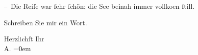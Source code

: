 \pstart
           – Die Reiſe war{ }ſehr{ }ſchön; die See beinah immer vollko{\geminationm}en{ }ſtill.\pend
           
\pstart
           {\pb}Schreiben Sie mir ein Wort.\pend
           
\pstart
           Herzlichſt Ihr{\\[\baselineskip]}\spacefill\mbox{A.}\pend
           \leftskip=0em{}\endnumbering{}  \newcommand{\dateiname}{L01510}\newcommand{\titel}{Arthur Schnitzler an Richard Beer-Hofmann, 23. 3. 1905}\newcommand{\editorInnen}{Martin Anton Müller und Gerd-Hermann Susen}
